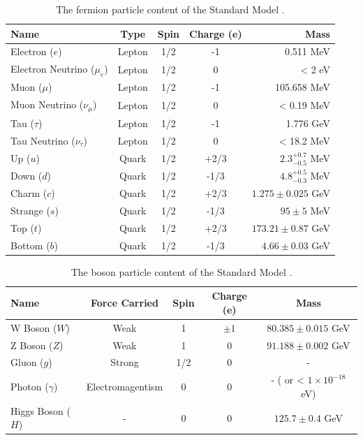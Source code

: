 \begin{table}[h!]
  \caption{The fermion particle content of the Standard Model \cite{Agashe:2014kda}.\label{tab:sm_fermions}}
  \centering
  \small
  \begin{tabular}{ lcccr }
    \hline
    \hline
    Name        & Type & Spin & Charge (e) & Mass \\
    \hline
    Electron ($e$)              & Lepton    & 1/2    & -1     & 0.511 MeV  \\
    Electron Neutrino ($\mu_{e}$)& Lepton   & 1/2    & 0      & < 2 eV  \\
    Muon ($\mu$)                & Lepton    & 1/2    & -1     & 105.658 MeV  \\
    Muon Neutrino ($\nu_{\mu}$) & Lepton    & 1/2    & 0      & < 0.19 MeV \\
    Tau ($\tau$)                & Lepton    & 1/2    & -1     & 1.776 GeV  \\
    Tau Neutrino ($\nu_{\tau}$) & Lepton    & 1/2    & 0      & < 18.2 MeV \\
    Up ($u$)                    & Quark     & 1/2    & +2/3   & $2.3^{+0.7}_
    {-0.5}$ MeV \\
    Down ($d$)                  & Quark     & 1/2    & -1/3   & $4.8^{+0.5}_
    {-0.3}$ MeV \\
    Charm ($c$)                 & Quark     & 1/2    & +2/3   & $1.275 \pm
    0.025$ GeV \\
    Strange ($s$)               & Quark     & 1/2    & -1/3   & $95 \pm 5$ MeV\\
    Top ($t$)                   & Quark     & 1/2    & +2/3   & $173.21 \pm 0.87$ GeV \\
    Bottom ($b$)                & Quark     & 1/2    & -1/3   & $4.66 \pm 0.03$
    GeV \\
    \hline
    \hline
  \end{tabular}
\end{table}

\begin{table}[h!]
  \caption{The boson particle content of the Standard Model \cite{Agashe:2014kda}.\label{tab:sm_bosons}}
  \centering
  \small
  \begin{tabular}{ lcccc }
    \hline
    \hline
    Name                            & Force Carried & Spin & Charge (e) & Mass \\
    \hline
    W Boson ($W$)     & Weak        & 1    & $\pm 1$  & $80.385 \pm 0.015$ GeV \\
    Z Boson ($Z$)     & Weak        & 1    & 0        & $91.188 \pm 0.002$ GeV \\
    Gluon ($g$)       & Strong      & 1/2  & 0        & - \\
    Photon ($\gamma$) & Electromagentism   & 0  & 0   & - ( or < $1\times10^
    {-18}$
    eV)\\
    Higgs Boson ($H$) & -           & 0    & 0        & $125.7 \pm 0.4$ GeV \\
    \hline
    \hline
  \end{tabular}
\end{table}

